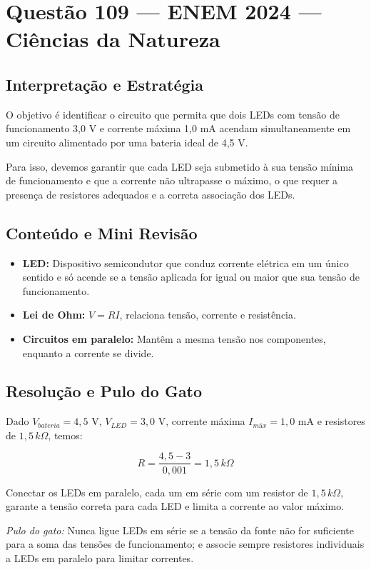 \documentclass{article}
\begin{document}
\section*{Questão 109 — ENEM 2024 — Ciências da Natureza}

\subsection*{Interpretação e Estratégia}

O objetivo é identificar o circuito que permita que dois LEDs com tensão de funcionamento 3,0 V e corrente máxima 1,0 mA acendam simultaneamente em um circuito alimentado por uma bateria ideal de 4,5 V.

Para isso, devemos garantir que cada LED seja submetido à sua tensão mínima de funcionamento e que a corrente não ultrapasse o máximo, o que requer a presença de resistores adequados e a correta associação dos LEDs.

\subsection*{Conteúdo e Mini Revisão}

\begin{itemize}
  \item \textbf{LED:} Dispositivo semicondutor que conduz corrente elétrica em um único sentido e só acende se a tensão aplicada for igual ou maior que sua tensão de funcionamento.
  \item \textbf{Lei de Ohm:} $V = R I$, relaciona tensão, corrente e resistência.
  \item \textbf{Circuitos em paralelo:} Mantêm a mesma tensão nos componentes, enquanto a corrente se divide.
\end{itemize}

\subsection*{Resolução e Pulo do Gato}

Dado $V_{bateria} = 4,5$ V, $V_{LED} = 3,0$ V, corrente máxima $I_{máx} = 1,0$ mA e resistores de $1,5\,k\Omega$, temos:

\[
R = \frac{4,5 - 3}{0,001} = 1,5\,k\Omega
\]

Conectar os LEDs em paralelo, cada um em série com um resistor de $1,5\,k\Omega$, garante a tensão correta para cada LED e limita a corrente ao valor máximo.

\textit{Pulo do gato:} Nunca ligue LEDs em série se a tensão da fonte não for suficiente para a soma das tensões de funcionamento; e associe sempre resistores individuais a LEDs em paralelo para limitar correntes.
\end{document}

